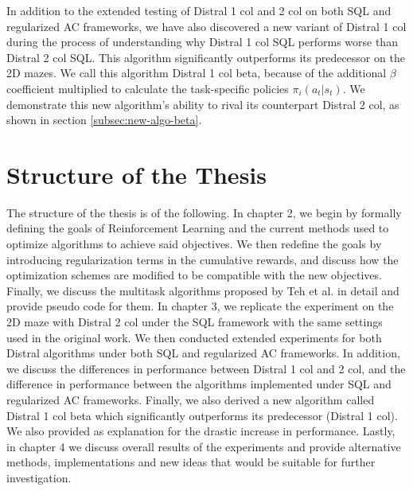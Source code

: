 \documentclass[12pt]{report}
\begin{document}
In addition to the extended testing of Distral 1 col and 2 col on both SQL and regularized AC frameworks, we have also discovered a new variant of Distral 1 col during the process of understanding why Distral 1 col SQL performs worse than Distral 2 col SQL. This algorithm significantly outperforms its predecessor on the 2D mazes. We call this algorithm Distral 1 col beta, because of the additional $\beta$ coefficient multiplied to calculate the task-specific policies $\pi_i(a_t|s_t)$. We demonstrate this new algorithm's ability to rival its counterpart Distral 2 col, as shown in section \ref{subsec:new-algo-beta}.

\section{Structure of the Thesis}

The structure of the thesis is of the following. In chapter 2, we begin by formally defining the goals of Reinforcement Learning and the current methods used to optimize algorithms to achieve said objectives. We then redefine the goals by introducing regularization terms in the cumulative rewards, and discuss how the optimization schemes are modified to be compatible with the new objectives. Finally, we discuss the multitask algorithms proposed by Teh et al. in detail and provide pseudo code for them. In chapter 3, we replicate the experiment on the 2D maze with Distral 2 col under the SQL framework with the same settings used in the original work. We then conducted extended experiments for both Distral algorithms under both SQL and regularized AC frameworks. In addition, we discuss the differences in performance between Distral 1 col and 2 col, and the difference in performance between the algorithms implemented under SQL and regularized AC frameworks. Finally, we also derived a new algorithm called Distral 1 col beta which significantly outperforms its predecessor (Distral 1 col). We also provided as explanation for the drastic increase in performance. Lastly, in chapter 4 we discuss overall results of the experiments and provide alternative methods, implementations and new ideas that would be suitable for further investigation.

\end{document}
